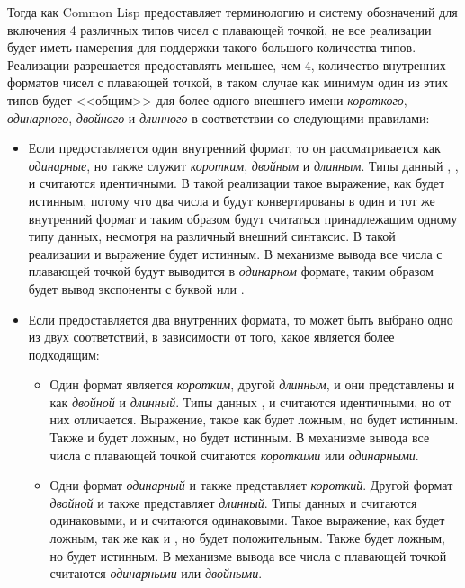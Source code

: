 Тогда как Common Lisp предоставляет терминологию и систему обозначений для
включения 4 различных типов чисел с плавающей точкой, не все реализации будет
иметь намерения для поддержки такого большого количества типов.
Реализации разрешается предоставлять меньшее, чем 4, количество внутренних
форматов чисел с плавающей точкой, в таком случае как минимум один из этих типов
будет <<общим>> для более одного внешнего имени \emph{короткого}, \emph{одинарного},
\emph{двойного} и \emph{длинного} в соответствии со следующими правилами:
\begin{itemize}
\item
Если предоставляется один внутренний формат, то он рассматривается как
\emph{одинарные}, но также служит \emph{коротким}, \emph{двойным} и
\emph{длинным}.
Типы данный , ,  и
 считаются идентичными. В такой реализации такое выражение, как
 будет истинным, потому что два числа  и
 будут конвертированы в один и тот же внутренний формат и таким
образом будут считаться принадлежащим одному типу данных, несмотря на различный
внешний синтаксис.
В такой реализации и выражение  будет истинным.
В механизме вывода все числа с плавающей точкой будут выводится в
\emph{одинарном} формате, таким образом будет вывод экспоненты  с буквой 
или .
\item
Если предоставляется два внутренних формата, то может быть выбрано одно из двух
соответствий, в зависимости от того, какое является более подходящим:
\begin{itemize}
\item
Один формат является \emph{коротким}, другой \emph{длинным}, и они представлены
и как \emph{двойной} и \emph{длинный}.
Типы данных ,  и  считаются
идентичными, но  от них отличается.
Выражение, такое как  будет ложным, но  будет истинным. Также и  будет ложным,
но  будет истинным.
В механизме вывода все числа с плавающей точкой считаются \emph{короткими} или
\emph{одинарными}.
\item 
Одни формат \emph{одинарный} и также представляет \emph{короткий}.
Другой формат \emph{двойной} и также представляет \emph{длинный}.
Типы данных  и  считаются
одинаковыми, и  и  считаются одинаковыми.
Такое выражение, как  будет ложным, так же как и , но  будет положительным.
Также  будет ложным, но  будет истинным.
В механизме вывода все числа с плавающей точкой считаются \emph{одинарными} или
\emph{двойными}.
\end{itemize}


\end{itemize}
